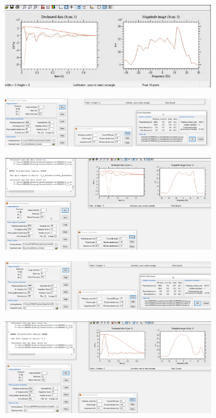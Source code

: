 \begin{figure}[H]
    \centering
    \includegraphics[width = 0.8\textwidth]{Screenshot2/9_2Messergebnisse.jpg}
\end{figure}


\begin{figure}[H]
    \centering
    \includegraphics[width = 0.8\textwidth]{Screenshot2/9_2_Messwerte_echozeithoeher_fovhoeher.jpg}
\end{figure}

\begin{figure}[H]
    \centering
    \includegraphics[width = 0.8\textwidth]{Screenshot2/9_2_Messergebnisse_echozeithoeher_fovhoeher.jpg}
\end{figure}

\begin{figure}[H]
    \centering
    \includegraphics[width = 0.8\textwidth]{Screenshot2/9_4Messwerte.jpg}
\end{figure}

\begin{figure}[H]
    \centering
    \includegraphics[width = 0.8\textwidth]{Screenshot2/9_4Messergebnisse.jpg}
\end{figure}

